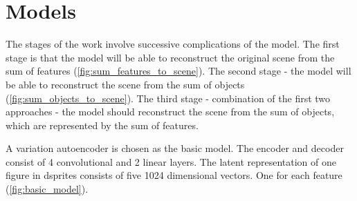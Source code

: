 \documentclass{article}
\begin{document}
    \section{Models}

    The stages of the work involve successive complications of the model.
    The first stage is that the model will be able to reconstruct the
    original scene from the sum of features (\autoref{fig:sum_features_to_scene}).
    The second stage - the model will be able to reconstruct the scene
    from the sum of objects (\autoref{fig:sum_objects_to_scene}). The third stage - combination of the first
    two approaches - the model should reconstruct the scene
    from the sum of objects, which are represented by the sum of features.

    A variation autoencoder is chosen as the basic model. The encoder and
    decoder consist of 4 convolutional and 2 linear layers. The latent
    representation of one figure in dsprites consists of five 1024
    dimensional vectors. One for each feature (\autoref{fig:basic_model}).
\end{document}
